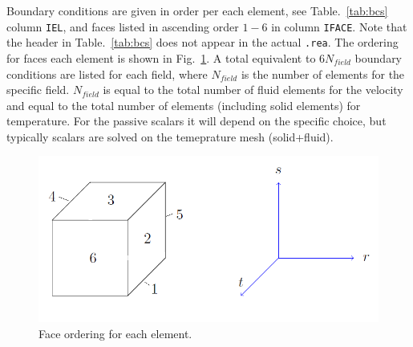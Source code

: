 \begin{description}
Boundary conditions are given in order per each element, see Table.~\ref{tab:bcs} column \texttt{IEL}, and faces listed in ascending order $1-6$ in column \texttt{IFACE}. Note that the header in Table.~\ref{tab:bcs} does not appear in the actual \texttt{.rea}.
The ordering for faces each element is shown in Fig.~\ref{fig:forder}. A total equivalent to $6N_{field}$ boundary conditions are listed for each field, where $N_{field}$ is the number of elements for the specific field. $N_{field}$ is equal to the total number of fluid elements for the velocity and equal to the total number of elements (including solid elements) for temperature. For the passive scalars it will depend on the specific choice, but typically scalars are solved on the temeprature mesh (solid+fluid). 

\begin{figure}
\begin{center}
\includegraphics[scale=0.5]{Figs/3dcube_2}
\caption{Face ordering for each element.}
\label{fig:forder}
\end{center}
\end{figure}


\end{description}

